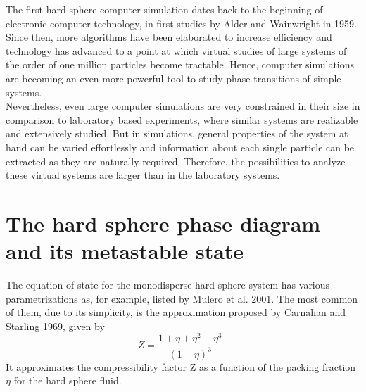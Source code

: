 The first hard sphere computer simulation dates back to the beginning of electronic computer technology, in first studies by Alder and Wainwright in 1959\cite{Alders59}. Since then, more algorithms have been elaborated to increase efficiency and technology has advanced to a point at which virtual studies of large systems of the order of one million particles become tractable. Hence, computer simulations are becoming an even more powerful tool to study phase transitions of simple systems.\\

Nevertheless, even large computer simulations are very constrained in their size in comparison to laboratory based experiments, where similar systems are realizable and extensively studied. But in simulations, general properties of the system at hand can be varied effortlessly and information about each single particle can be extracted as they are naturally required. Therefore, the possibilities to analyze these virtual systems are larger than in the laboratory systems.
\section{The hard sphere phase diagram and its metastable state}
\label{sec:HS_phase_diagram}
The equation of state for the monodisperse hard sphere system has various parametrizations as, for example, listed by Mulero et al. 2001\cite{Mulero2001}. The most common of them, due to its simplicity, is the approximation proposed by Carnahan and Starling 1969\cite{Carnahan1969}, given by
\begin{equation}
\label{eqn:CS}
Z=\frac{1+\eta+\eta^2-\eta^3}{(1-\eta)^3} \; \text{.}
\end{equation}
It approximates the compressibility factor Z as a function of the packing fraction $\eta$ for the hard sphere fluid.\\

